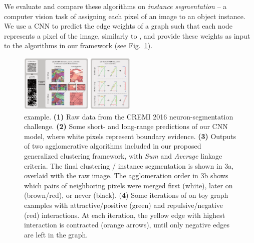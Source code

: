 We evaluate and compare these algorithms on \emph{instance segmentation} -- a computer vision task of assigning each pixel of an image to an object instance. 
We use a CNN to predict the edge weights of a graph such that each node represents a pixel of the image, similarly to \cite{liu2018affinity,lee2017superhuman,wolf2018mutex}, and provide these weights as input to the algorithms in our framework (see Fig.~\ref{fig:intro_figure}). 

\begin{figure}[t]
\centering
\includegraphics[width=0.5\textwidth]{figs/intro_image_v4.pdf} %
\caption{\algname{} example. \textbf{(1)} Raw data from the CREMI 2016 neuron-segmentation challenge. \textbf{(2)} Some short- and long-range predictions of our CNN model, where white pixels represent boundary evidence. \textbf{(3)} Outputs of two agglomerative algorithms included in our proposed generalized clustering framework, with \emph{Sum} and \emph{Average} linkage criteria. The final clustering / instance segmentation is shown in 3a, overlaid with the raw image.  The  agglomeration order in 3b shows which pairs of neighboring pixels were merged first (white), later on (brown/red), or never (black). (\textbf{4}) Some iterations of \algname{} on toy graph examples with attractive/positive (green) and repulsive/negative (red) interactions. At each iteration, the yellow edge with highest interaction is contracted (orange arrows), until only negative edges are left in the graph. 
\label{fig:intro_figure}}
\end{figure}

